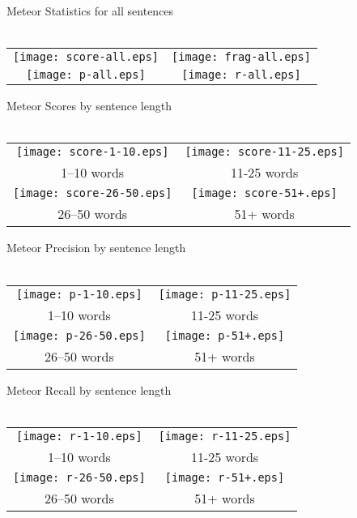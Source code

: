 \documentclass[landscape]{article}
\begin{document}
\noindent\Large
Meteor Statistics for all sentences\\\\
\large
\begin{tabular}{cc}
\texttt{[image: score-all.eps]} & \texttt{[image: frag-all.eps]} \\
\texttt{[image: p-all.eps]} & \texttt{[image: r-all.eps]} \\
\end{tabular}

\newpage

\noindent\Large
Meteor Scores by sentence length\\\\
\large
\begin{tabular}{cc}
\texttt{[image: score-1-10.eps]} & \texttt{[image: score-11-25.eps]} \\
1--10 words & 11-25 words \\
\texttt{[image: score-26-50.eps]} & \texttt{[image: score-51+.eps]} \\
26--50 words & 51+ words \\
\end{tabular}

\newpage

\noindent\Large
Meteor Precision by sentence length\\\\
\large
\begin{tabular}{cc}
\texttt{[image: p-1-10.eps]} & \texttt{[image: p-11-25.eps]} \\
1--10 words & 11-25 words \\
\texttt{[image: p-26-50.eps]} & \texttt{[image: p-51+.eps]} \\
26--50 words & 51+ words \\
\end{tabular}

\newpage

\noindent\Large
Meteor Recall by sentence length\\\\
\large
\begin{tabular}{cc}
\texttt{[image: r-1-10.eps]} & \texttt{[image: r-11-25.eps]} \\
1--10 words & 11-25 words \\
\texttt{[image: r-26-50.eps]} & \texttt{[image: r-51+.eps]} \\
26--50 words & 51+ words \\
\end{tabular}
\end{document}
